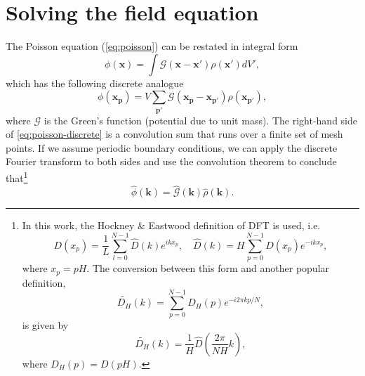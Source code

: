 \section{Solving the field equation}\label{subsec:solving-the-field-equation}
The Poisson equation (\autoref{eq:poisson}) can be restated in integral form
\begin{equation*}
    \phi(\mathbf{x}) = \int \mathcal{G}(\mathbf{x}-\mathbf{x}')\rho(\mathbf{x}') dV',
\end{equation*}
which has the following discrete analogue
\begin{equation}\label{eq:poisson-discrete}
    \phi(\mathbf{x}_\mathbf{p}) = V \sum_{\mathbf{p}'} \mathcal{G}(\mathbf{x}_\mathbf{p} - \mathbf{x}_{\mathbf{p}'}) \rho(\mathbf{x}_{\mathbf{p}'}),
\end{equation}
where $\mathcal{G}$ is the Green's function (potential due to unit mass).
The right-hand side of \autoref{eq:poisson-discrete} is a convolution sum that runs over a finite set of mesh points.
If we assume periodic boundary conditions, we can apply the discrete Fourier transform to both sides and use the convolution theorem to conclude that\footnote{
    In this work, the Hockney \& Eastwood definition of DFT is used, i.e.
    \begin{equation*}
        D(x_p) = \frac{1}{L}\sum_{l=0}^{N-1}\hat{D}(k)e^{ikx_p}, \quad \hat{D}(k) = H\sum_{p=0}^{N-1}D(x_p)e^{-ikx_p},
    \end{equation*}
    where $x_p = pH$.
    The conversion between this form and another popular definition,
    \begin{equation}\label{eq:standard-dft}
        \widetilde{D_H}(k) = \sum_{p=0}^{N-1}D_H(p)e^{-i2\pi kp / N},
    \end{equation}
    is given by
    \begin{equation*}
        \widetilde{D_H}(k) = \frac{1}{H}\hat{D}\left(\frac{2\pi}{NH}k\right),
    \end{equation*}
    where $D_H(p) = D(pH)$.
}
\begin{equation}\label{eq:poisson-fourier-product}
    \hat{\phi}(\mathbf{k}) = \hat{\mathcal{G}}(\mathbf{k}) \hat{\rho}(\mathbf{k}).
\end{equation}

